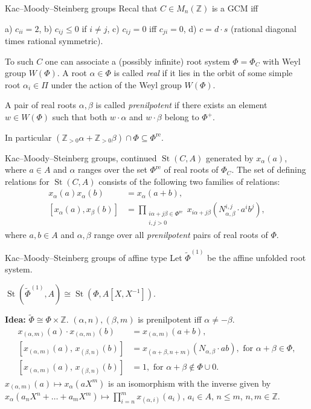 \documentclass{beamer} %
\DeclareMathOperator{\St}{St}
\theoremstyle{definition}
\begin{document}
\begin{frame}{Kac--Moody--Steinberg groups}
Recal that $C\in M_n(\mathbb{Z})$ is a GCM iff 

a) $c_{ii}=2$, b) $c_{ij}\leq 0$ if $i\neq j$, c) $c_{ij}=0$ iff $c_{ji}=0$, d) $c = d \cdot s$ (rational diagonal times rational symmetric). 

\pause To such $C$ one can associate a (possibly infinite) root system $\Phi = \Phi_C$ with Weyl group $W(\Phi)$. 
\pause A root $\alpha \in \Phi$ is called \textit{real} if it lies in the orbit of some simple root $\alpha_i \in \Pi$ under the action of the Weyl group $W(\Phi)$.

\pause A pair of real roots $\alpha, \beta$ is called \textit{prenilpotent} if there exists an element $w \in W(\Phi)$ such that both $w\cdot \alpha$ and $w \cdot \beta$ belong to $\Phi^+.$

\pause In particular $(\mathbb{Z}_{>0} \alpha + \mathbb{Z}_{>0}\beta)\cap \Phi \subseteq \Phi^\mathrm{re}$.
\end{frame}

\begin{frame}{Kac--Moody--Steinberg groups, continued}
$\St(C, A)$ generated by $x_\alpha(a)$, where $a \in A$ and $\alpha$ ranges over the set $\Phi^\mathrm{re}$ of real roots of $\Phi_C$.
The set of defining relations for $\St(C, A)$ consists of the following two families of relations:
\begin{align}
x_\alpha(a) x_\alpha(b) & =  x_\alpha(a + b), \label{SKM1} \\
[x_\alpha(a), x_\beta(b)] & =  \prod \limits_{\substack{i\alpha+j\beta \in \Phi^\mathrm{re} \\ i, j > 0 }} x_{i\alpha+j\beta}(N_{\alpha, \beta}^{i, j} \cdot a^i b^j), \label{SKM2}
\end{align}
where $a, b \in A$ and $\alpha, \beta$ range over all {\it prenilpotent} pairs of real roots of $\Phi$.
\end{frame}

\begin{frame}{Kac--Moody--Steinberg groups of affine type}
Let $\widetilde{\Phi}^{(1)}$ be the affine unfolded root system.
\pause \begin{lemma}
$\St(\widetilde{\Phi}^{(1)}, A) \cong \St(\Phi, A[X, X^{-1}])$.
\end{lemma}
\pause \textbf{Idea:}
$\widetilde{\Phi} \cong \Phi \times \mathbb{Z}.$ $(\alpha, n), (\beta, m)$ is prenilpotent iff $\alpha \neq - \beta$.
\begin{align*}
x_{(\alpha, m)}(a)\cdot x_{(\alpha, m)}(b)&=x_{(\alpha, m)}(a+b), \\
[x_{(\alpha, m)}(a),\,x_{(\beta, n)}(b)]  &=x_{(\alpha+\beta, n+m)}(N_{\alpha,\beta} \cdot ab),\text{ for }\alpha+\beta\in\Phi, \\
[x_{(\alpha, m)}(a),\,x_{(\beta, n)}(b)]  &=1,\text{ for }\alpha+\beta\not\in\Phi\cup0.
\end{align*}
\pause $x_{(\alpha, m)}(a) \mapsto x_\alpha(aX^m)$ is an isomorphism with the inverse given by
$x_\alpha(a_{n}X^n + \ldots + a_m X^m) \mapsto \prod_{i=n}^m x_{(\alpha, i)}(a_i)$, $a_i \in A$, $n \leq m$, $n, m\in \mathbb{Z}.$
\end{frame}
\end{document}

